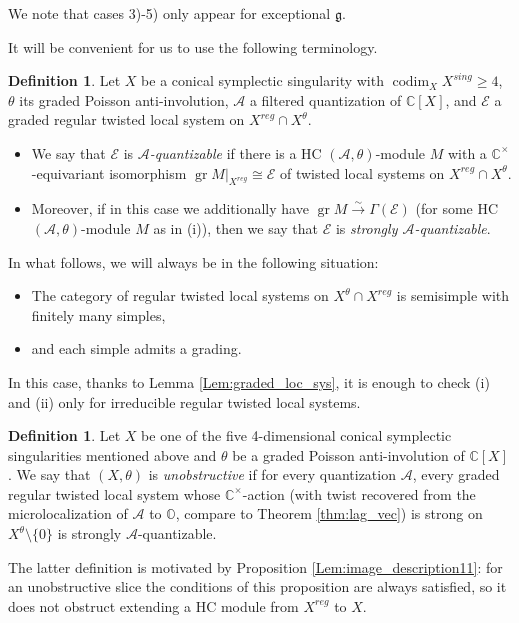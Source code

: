 \documentclass[12pt]{amsart}
\newcommand{\C}{\mathbb{C}}
\newcommand{\A}{\mathcal{A}}
\newcommand{\g}{\mathfrak{g}}
\newcommand{\Orb}{\mathbb{O}}
\newcommand{\gr}{\operatorname{gr}}
\theoremstyle{definition}
\newtheorem{defi}[Thm]{Definition}
\numberwithin{equation}{section}
\begin{document}
We note that cases 3)-5) only appear for exceptional $\g$.

It will be convenient for us to use the following terminology.

\begin{defi}\label{defi:loc_sys_quantized}
Let $X$ be a conical symplectic singularity with $\operatorname{codim}_X X^{sing}\geqslant 4$, $\theta$ its graded Poisson anti-involution,
$\A$ a filtered quantization of $\C[X]$, and $\mathcal{E}$ a graded regular twisted local system on $X^{reg}\cap X^\theta$.
\begin{itemize}
\item[(i)]
We say that $\mathcal{E}$ is {\it $\A$-quantizable} if there is
a HC $(\A,\theta)$-module $M$ with a $\C^\times$-equivariant isomorphism $\gr M|_{X^{reg}}\cong \mathcal{E}$
of twisted local systems on $X^{reg}\cap X^\theta$.
\item[(ii)] Moreover, if in this case we additionally have
$\gr M\xrightarrow{\sim} \Gamma(\mathcal{E})$ (for some HC $(\A,\theta)$-module $M$ as in (i)), then we say that $\mathcal{E}$ is {\it strongly $\A$-quantizable}.
\end{itemize}
\end{defi}

In what follows, we will always be in the following situation:
\begin{itemize}
\item The category of regular twisted local systems on $X^\theta\cap X^{reg}$ is semisimple with finitely many simples,
\item and each simple admits a grading.
\end{itemize}

In this case, thanks to Lemma \ref{Lem:graded_loc_sys}, it is enough to check (i) and (ii) only
for irreducible regular twisted local systems.


\begin{defi}\label{defi:obstructive_slice}
Let $X$ be one of the five 4-dimensional conical symplectic singularities mentioned above
and $\theta$ be a graded Poisson anti-involution of $\C[X]$. We say that $(X,\theta)$
is {\it unobstructive} if for every quantization $\A$, every graded regular twisted local system whose
$\C^\times$-action (with twist recovered from the microlocalization of $\A$ to $\Orb$, compare to Theorem 
\ref{thm:lag_vec}) is strong on $X^\theta\setminus \{0\}$ is strongly $\A$-quantizable.
\end{defi}

The latter definition is motivated by Proposition \ref{Lem:image_description11}: for an unobstructive slice the conditions of this proposition are always satisfied, so it does not obstruct extending
a HC module from $X^{reg}$ to $X$.
\end{document}
